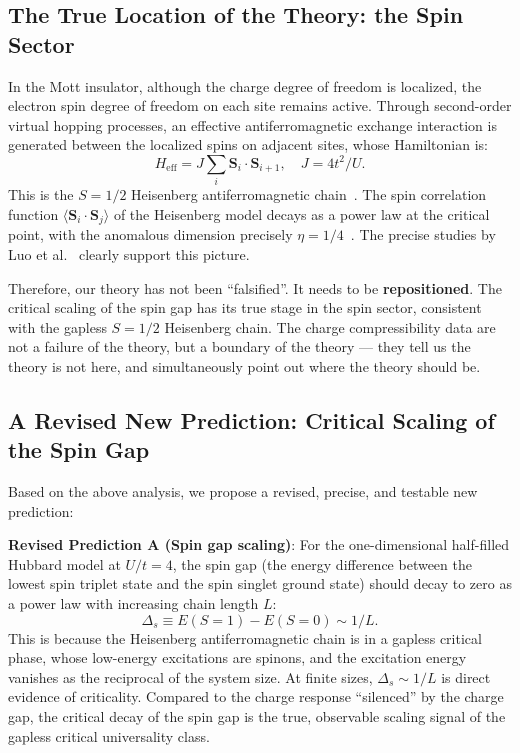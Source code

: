 \documentclass[prb,reprint,twocolumn,superscriptaddress]{revtex4-2}
\begin{document}
\subsection{The True Location of the Theory: the Spin Sector}

In the Mott insulator, although the charge degree of freedom is localized, the electron spin degree of freedom on each site remains active. Through second-order virtual hopping processes, an effective antiferromagnetic exchange interaction is generated between the localized spins on adjacent sites, whose Hamiltonian is:
\begin{equation}
H_{\mathrm{eff}} = J \sum_i \mathbf{S}_i \cdot \mathbf{S}_{i+1}, \quad J = 4t^2/U.
\end{equation}
This is the $S = 1/2$ Heisenberg antiferromagnetic chain~\cite{Affleck1989,Giamarchi2004}. The spin correlation function $\langle \mathbf{S}_i \cdot \mathbf{S}_j \rangle$ of the Heisenberg model decays as a power law at the critical point, with the anomalous dimension precisely $\eta = 1/4$~\cite{Schulz1990}. The precise studies by Luo et al.~\cite{Luo2023,Luo2024} clearly support this picture.

Therefore, our theory has not been ``falsified''. It needs to be \textbf{repositioned}. The critical scaling of the spin gap has its true stage in the spin sector, consistent with the gapless $S=1/2$ Heisenberg chain. The charge compressibility data are not a failure of the theory, but a boundary of the theory --- they tell us the theory is not here, and simultaneously point out where the theory should be.

\subsection{A Revised New Prediction: Critical Scaling of the Spin Gap}

Based on the above analysis, we propose a revised, precise, and testable new prediction:

\textbf{Revised Prediction A (Spin gap scaling)}: For the one-dimensional half-filled Hubbard model at $U/t = 4$, the spin gap (the energy difference between the lowest spin triplet state and the spin singlet ground state) should decay to zero as a power law with increasing chain length $L$:
\begin{equation}
\Delta_s \equiv E(S=1) - E(S=0) \sim 1/L.
\end{equation}
This is because the Heisenberg antiferromagnetic chain is in a gapless critical phase, whose low-energy excitations are spinons, and the excitation energy vanishes as the reciprocal of the system size. At finite sizes, $\Delta_s \sim 1/L$ is direct evidence of criticality. Compared to the charge response ``silenced'' by the charge gap, the critical decay of the spin gap is the true, observable scaling signal of the gapless critical universality class.
\end{document}
